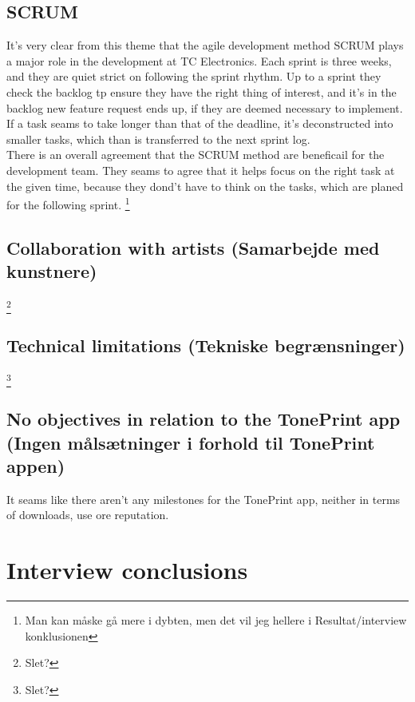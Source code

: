 \subsection*{SCRUM}
\label{ThemeScrum}
It's very clear from this theme that the agile development method SCRUM plays a major role in the development at TC Electronics. Each sprint is three weeks, and they are quiet strict on following the sprint rhythm. Up to a sprint they check the backlog tp ensure they have the right thing of interest, and it's in the backlog new feature request ends up, if they are deemed necessary to implement. If a task seams to take longer than that of the deadline, it's deconstructed into smaller tasks, which than is transferred to the next sprint log.\\
There is an overall agreement that the SCRUM method are beneficail for the development team. They seams to agree that it helps focus on the right task at the given time, because they dond't have to think on the tasks, which are planed for the following sprint. \footnote{Man kan måske gå mere i dybten, men det vil jeg hellere i Resultat/interview konklusionen} 

\subsection*{Collaboration with artists (Samarbejde med kunstnere)} 
\label{ThemeCollaborationWithArtists}
\footnote{Slet?}

\subsection*{Technical limitations (Tekniske begrænsninger)} 
\label{ThemeTechnicalLimitations}
\footnote{Slet?}

\subsection*{No objectives in relation to the TonePrint app (Ingen målsætninger i forhold til TonePrint appen)} 
\label{ThemeNoObjectivesInRelationToTheTonePrintApp}
It seams like there aren't any milestones for the TonePrint app, neither in terms of downloads, use ore reputation. 

\section{Interview conclusions}

